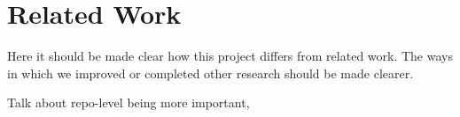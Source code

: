 \section{Related Work}
\label{sec:relwork}
Here it should be made clear how this project differs from related work.
The ways in which we improved or completed other research should be made clearer.

Talk about repo-level being more important, \cite{risse2024scorewrongexambenchmarking} 